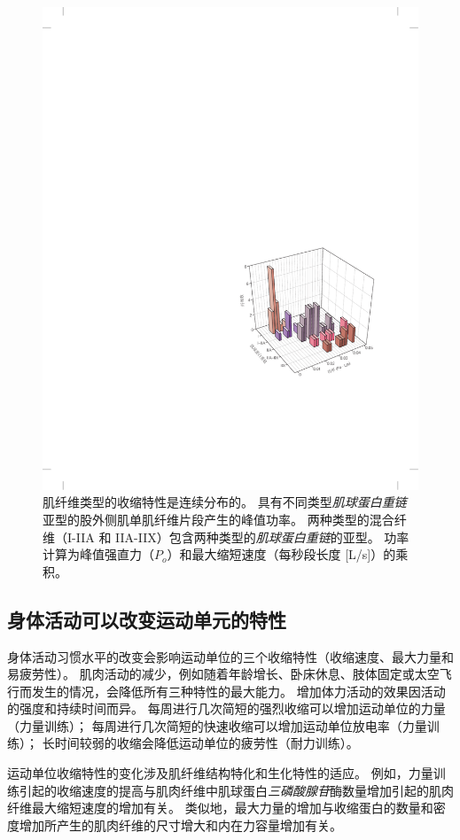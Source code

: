 \begin{figure}[htbp]
	\centering
	\includegraphics[width=0.63\linewidth]{chap31/fig_31_4}
	\caption{肌纤维类型的收缩特性是连续分布的。
	具有不同类型\textit{肌球蛋白重链}亚型的股外侧肌单肌纤维片段产生的峰值功率。
	两种类型的混合纤维（I-IIA 和 IIA-IIX）包含两种类型的\textit{肌球蛋白重链}的亚型。
	功率计算为峰值强直力（$P_o$）和最大缩短速度（每秒段长度 [L/s]）的乘积\cite{bottinelli1996force}。}
	\label{fig:31_4}
\end{figure}



\subsection{身体活动可以改变运动单元的特性}

身体活动习惯水平的改变会影响运动单位的三个收缩特性（收缩速度、最大力量和易疲劳性）。
肌肉活动的减少，例如随着年龄增长、卧床休息、肢体固定或太空飞行而发生的情况，会降低所有三种特性的最大能力。
增加体力活动的效果因活动的强度和持续时间而异。
每周进行几次简短的强烈收缩可以增加运动单位的力量（力量训练）；
每周进行几次简短的快速收缩可以增加运动单位放电率（力量训练）；
长时间较弱的收缩会降低运动单位的疲劳性（耐力训练）。


运动单位收缩特性的变化涉及肌纤维结构特化和生化特性的适应。
例如，力量训练引起的收缩速度的提高与肌肉纤维中肌球蛋白\textit{三磷酸腺苷}酶数量增加引起的肌肉纤维最大缩短速度的增加有关。
类似地，最大力量的增加与收缩蛋白的数量和密度增加所产生的肌肉纤维的尺寸增大和内在力容量增加有关。


